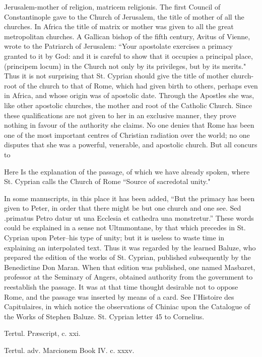 Jerusalem-mother of religion, matricem religionis. The first Council of Constantinople gave to the Church of Jerusalem, the title of mother of all the churches. In Africa the title of matrix or mother was given to all the great metropolitan churches. A Gallican bishop of the fifth century, Avitus of Vienne, wrote to the Patriarch of Jerusalem: “Your apostolate exercises a primacy granted to it by God: and it is careful to show that it occupies a principal place, (principem locum) in the Church not only by its privileges, but by its merits." Thus it is not surprising that St. Cyprian should give the title of mother church-root of the church to that of Rome, which had given birth to others, perhaps even in Africa, and whose origin was of apostolic date. Through the Apostles she was, like other apostolic churches, the mother and root of the Catholic Church. Since these qualifications are not given to her in an exclusive manner, they prove nothing in favour of the authority she claims. No one denies that Rome has been one of the most important centres of Christian radiation over the world; no one disputes that she was a powerful, venerable, and apostolic church. But all concurs to

Here Is the explanation of the passage, of which we have already spoken, where St. Cyprian calls the Church of Rome “Source of sacredotal unity."

In some manuscripts, in this place it has been added, “But the primacy has been given to Peter, in order that there might be but one church and one see. Sed .primatus Petro datur ut una Ecclesia et cathedra una monstretur.” These words could be explained in a sense not Ultmmontane, by that which precedes in St. Cyprian upon Peter--his type of unity; but it is useless to waste time in explaining an interpolated text. Thus it was regarded by the learned Baluze, who prepared the edition of the works of St. Cyprian, published subsequently by the Benedictine Don Maran. When that edition was published, one named Masbaret, professor at the Seminary of Angers, obtained authority from the government to reestablish the passage. It was at that time thought desirable not to oppose Rome, and the passage was inserted by means of a card. See I'Histoire des Capitulaires, in which notice the observations of Chiniac upon the Catalogue of the Works of Stephen Baluze. St. Cyprian letter 45 to Cornelius.

Tertul. Præscript, c. xxi.

Tertul. adv. Marcionem Book IV. c. xxxv.

